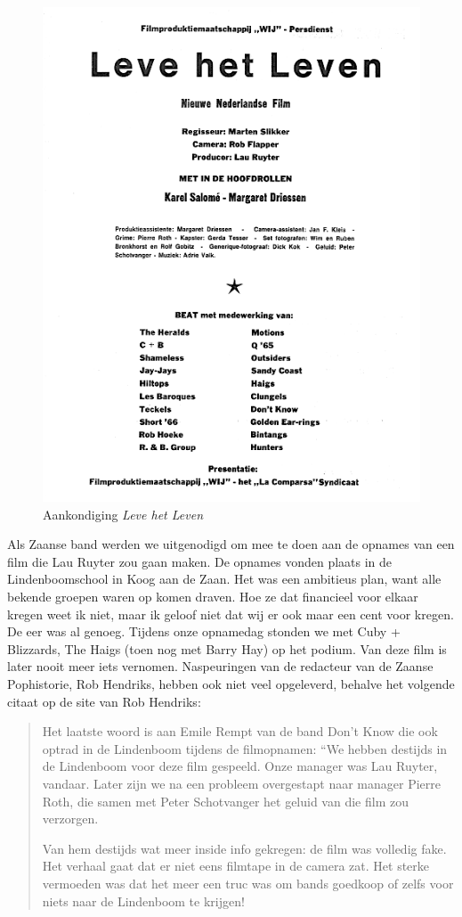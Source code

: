 \documentclass[12pt,twoside, openright]{memoir}
\begin{document}
\begin{figure}
\centering
\includegraphics[width=\textwidth]{img/ch30/film}
\caption*{\footnotesize Aankondiging \emph{Leve het Leven}}
\end{figure}

Als Zaanse band werden we uitgenodigd om mee te doen aan de opnames van een film die Lau Ruyter zou gaan maken. De opnames vonden plaats in de Lindenboomschool in Koog aan de Zaan. Het was een ambitieus plan, want alle bekende groepen waren op komen draven. Hoe ze dat financieel voor elkaar kregen weet ik niet, maar ik geloof niet dat wij er ook maar een cent voor kregen. De eer was al genoeg. Tijdens onze opnamedag stonden we met Cuby + Blizzards, The Haigs (toen nog met Barry Hay) op het podium. Van deze film is later nooit meer iets vernomen. Naspeuringen van de redacteur van de Zaanse Pophistorie, Rob Hendriks, hebben ook niet veel opgeleverd, behalve het volgende citaat op de site van Rob Hendriks: 

\begin{quote}
Het laatste woord is aan Emile Rempt van de band Don’t Know die ook optrad in de Lindenboom tijdens de filmopnamen: “We hebben destijds in de Lindenboom voor deze film gespeeld. Onze manager was Lau Ruyter, vandaar. Later zijn we na een probleem overgestapt naar manager Pierre Roth, die samen met Peter Schotvanger het geluid van die film zou verzorgen.

Van hem destijds wat meer inside info gekregen: de film was volledig fake. Het verhaal gaat dat er niet eens filmtape in de camera zat. Het sterke vermoeden was dat het meer een truc was om bands goedkoop of zelfs voor niets naar de Lindenboom te krijgen!
\end{quote}
\end{document}

